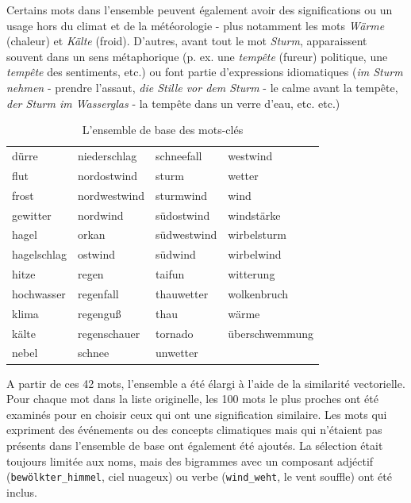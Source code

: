 \documentclass[a4paper,twoside,12pt]{article}
\begin{document}
Certains mots dans l'ensemble peuvent également avoir des significations ou un usage hors du climat et de la météorologie - plus notamment les mots \textit{Wärme} (chaleur) et \textit{Kälte} (froid). D'autres, avant tout le mot \textit{Sturm}, apparaissent souvent dans un sens métaphorique (p. ex. une \textit{tempête} (fureur) politique, une \textit{tempête} des sentiments, etc.) ou font partie d'expressions idiomatiques (\textit{im Sturm nehmen} - prendre l’assaut, \textit{die Stille vor dem Sturm} - le calme avant la tempête, \textit{der Sturm im Wasserglas} - la tempête dans un verre d’eau, etc. etc.)

\begin{table}[h]
    \centering
    \small
\begin{tabular}{llll}
\toprule
      dürre & niederschlag &  schneefall &       westwind \\
       flut &  nordostwind &       sturm &         wetter \\
      frost & nordwestwind &   sturmwind &           wind \\
   gewitter &     nordwind &  südostwind &     windstärke \\
      hagel &        orkan & südwestwind &    wirbelsturm \\
hagelschlag &      ostwind &     südwind &     wirbelwind \\
      hitze &        regen &      taifun &      witterung \\
 hochwasser &    regenfall &   thauwetter &    wolkenbruch \\
      klima &     regenguß &        thau &          wärme \\
      kälte & regenschauer &     tornado & überschwemmung \\
      nebel &       schnee &    unwetter &            \\
\bottomrule
\end{tabular}
    \caption{L'ensemble de base des mots-clés}
    \label{tab:weather_events}
\end{table}

A partir de ces 42 mots, l'ensemble a été élargi à l'aide de la similarité vectorielle. Pour chaque mot dans la liste originelle, les 100 mots le plus proches ont été examinés pour en choisir ceux qui ont une signification similaire. Les mots qui expriment des événements ou des concepts climatiques mais qui n'étaient pas présents dans l'ensemble de base ont également été ajoutés. La sélection était toujours limitée aux noms, mais des bigrammes avec un composant adjéctif (\texttt{bewölkter\_himmel}, ciel nuageux)  ou verbe (\texttt{wind\_weht}, le vent souffle) ont été inclus.
\end{document}
